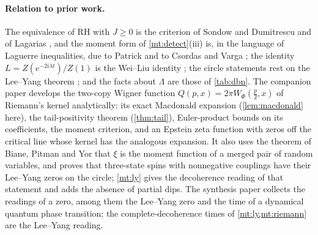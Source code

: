 \documentclass[11pt]{article}
\theoremstyle{definition}\newtheorem{definition}[theorem]{Definition}
\theoremstyle{remark}\newtheorem{remark}[theorem]{Remark}
\begin{document}
\paragraph{Relation to prior work.} The equivalence of RH with $J\ge0$ is the criterion of Sondow and Dumitrescu and of Lagarias \cite{SD,Lagarias}, and the moment form of \cref{mt:detect}(iii) is, in the language of Laguerre inequalities, due to Patrick and to Csordas and Varga \cite{Patrick,CV}; the identity $L=Z(e^{-2i\lambda t})/Z(1)$ is the Wei--Liu identity \cite{WeiLiu}; the circle statements rest on the Lee--Yang theorem \cite{LeeYang}; and the facts about $\Lambda$ are those of \cref{tab:dbn}. The companion paper \cite{SMath} develops the two-copy Wigner function $Q(p,x)=2\pi W_\Phi(\frac p2,x)$ of Riemann's kernel analytically: its exact Macdonald expansion (\cref{lem:macdonald} here), the tail-positivity theorem (\cref{thm:tail}), Euler-product bounds on its coefficients, the moment criterion, and an Epstein zeta function with zeros off the critical line whose kernel has the analogous expansion. It also uses the theorem of Biane, Pitman and Yor that $\xi$ is the moment function of a merged pair of random variables, and proves that three-state spins with nonnegative couplings have their Lee--Yang zeros on the circle; \cref{mt:ly} gives the decoherence reading of that statement and adds the absence of partial dips. The synthesis paper \cite{SZero} collects the readings of a zero, among them the Lee--Yang zero and the time of a dynamical quantum phase transition; the complete-decoherence times of \cref{mt:ly,mt:riemann} are the Lee--Yang reading.
\end{document}
